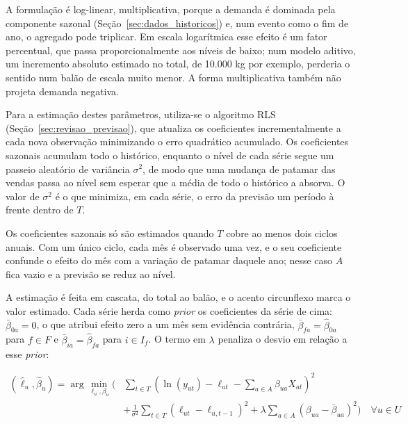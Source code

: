 \documentclass[
    12pt,
    openright,
    oneside,
    a4paper,
    fleqn,
    chapter=TITLE,
    section=TITLE,
    english,
    brazil
]{abntex2}
\begin{document}
A formulação é log-linear, multiplicativa, porque a demanda é dominada pela componente sazonal (Seção~\ref{sec:dados_historicos}) e, num evento como o fim de ano, o agregado pode triplicar. Em escala logarítmica esse efeito é um fator percentual, que passa proporcionalmente aos níveis de baixo; num modelo aditivo, um incremento absoluto estimado no total, de 10.000 kg por exemplo, perderia o sentido num balão de escala muito menor. A forma multiplicativa também não projeta demanda negativa.

Para a estimação destes parâmetros, utiliza-se o algoritmo RLS (Seção~\ref{sec:revisao_previsao}), que atualiza os coeficientes incrementalmente a cada nova observação minimizando o erro quadrático acumulado. Os coeficientes sazonais acumulam todo o histórico, enquanto o nível de cada série segue um passeio aleatório de variância $\sigma^{2}$, de modo que uma mudança de patamar das vendas passa ao nível sem esperar que a média de todo o histórico a absorva. O valor de $\sigma^{2}$ é o que minimiza, em cada série, o erro da previsão um período à frente dentro de $T$.

Os coeficientes sazonais só são estimados quando $T$ cobre ao menos dois ciclos anuais. Com um único ciclo, cada mês é observado uma vez, e o seu coeficiente confunde o efeito do mês com a variação de patamar daquele ano; nesse caso $A$ fica vazio e a previsão se reduz ao nível.

A estimação é feita em cascata, do total ao balão, e o acento circunflexo marca o valor estimado. Cada série herda como \textit{prior} os coeficientes da série de cima: $\bar{\beta}_{0a} = 0$, o que atribui efeito zero a um mês sem evidência contrária, $\bar{\beta}_{fa} = \hat{\beta}_{0a}$ para $f \in F$ e $\bar{\beta}_{ia} = \hat{\beta}_{fa}$ para $i \in I_f$. O termo em $\lambda$ penaliza o desvio em relação a esse \textit{prior}:
\begin{ceqn}
\begin{equation}
\begin{aligned}
\left( \hat{\ell}_{u}, \hat{\beta}_{u} \right) = \arg\min_{\ell_{u}, \beta_{u}} \Bigg( & \sum_{t \in T} \left( \ln(y_{ut}) - \ell_{ut} - \sum_{a \in A} \beta_{ua} X_{at} \right)^2 \\
& + \frac{1}{\sigma^{2}} \sum_{t \in T} \left( \ell_{ut} - \ell_{u,t-1} \right)^2 + \lambda \sum_{a \in A} \left( \beta_{ua} - \bar{\beta}_{ua} \right)^2 \Bigg) \quad \forall u \in U
\end{aligned}
\label{eq:demanda_cascata}
\end{equation}
\end{ceqn}
\end{document}
